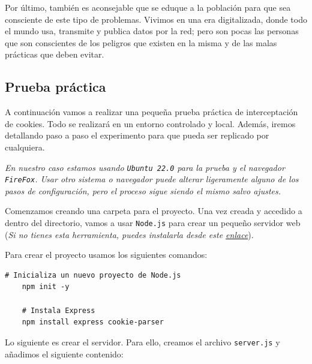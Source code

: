 Por último, también es aconsejable que se eduque a la población para que sea consciente de este tipo de problemas. Vivimos en una era digitalizada, donde todo el mundo usa, transmite y publica datos por la red; pero son pocas las personas que son conscientes de los peligros que existen en la misma y de las malas prácticas que deben evitar.

\subsection{Prueba práctica}

A continuación vamos a realizar una pequeña prueba práctica de interceptación de cookies. Todo se realizará en un entorno controlado y local. Además, iremos detallando paso a paso el experimento para que pueda ser replicado por cualquiera. 

\textit{En nuestro caso estamos usando \texttt{Ubuntu 22.0} para la prueba y el navegador \texttt{FireFox}. Usar otro sistema o navegador puede alterar ligeramente alguno de los pasos de configuración, pero el proceso sigue siendo el mismo salvo ajustes.}

Comenzamos creando una carpeta para el proyecto. Una vez creada y accedido a dentro del directorio, vamos a usar \texttt{Node.js} para crear un pequeño servidor web (\textit{Si no tienes esta herramienta, puedes instalarla desde este \href{https://nodejs.org/en/download/package-manager}{enlace}}).

Para crear el proyecto usamos los siguientes comandos:

\begin{lstlisting}[style=Consola]
    # Inicializa un nuevo proyecto de Node.js
    npm init -y
    
    # Instala Express
    npm install express cookie-parser
\end{lstlisting}

Lo siguiente es crear el servidor. Para ello, creamos el archivo \texttt{server.js} y añadimos el siguiente contenido:

